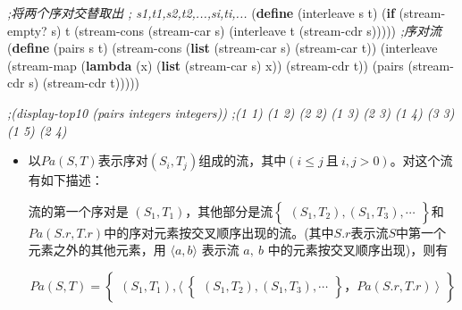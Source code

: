 \documentclass[]{article}
\date{}
\newenvironment{Shaded}{}{}
\newcommand{\KeywordTok}[1]{\textcolor[rgb]{0.00,0.44,0.13}{\textbf{#1}}}
\newcommand{\CommentTok}[1]{\textcolor[rgb]{0.38,0.63,0.69}{\textit{#1}}}
\newcommand{\FunctionTok}[1]{\textcolor[rgb]{0.02,0.16,0.49}{#1}}
\newcommand{\NormalTok}[1]{#1}
\begin{document}
\begin{Shaded}
\begin{Highlighting}[]
\CommentTok{;将两个序对交替取出}
\CommentTok{; s1,t1,s2,t2,...,si,ti,...}
\NormalTok{(}\KeywordTok{define}\FunctionTok{ }\NormalTok{(interleave s t)}
\NormalTok{    (}\KeywordTok{if}\NormalTok{ (stream-empty? s)}
\NormalTok{        t}
\NormalTok{        (stream-cons (stream-car s)}
\NormalTok{                     (interleave t (stream-cdr s)))))}
\CommentTok{;序对流}
\NormalTok{(}\KeywordTok{define}\FunctionTok{ }\NormalTok{(pairs s t)}
\NormalTok{    (stream-cons}
\NormalTok{        (}\KeywordTok{list}\NormalTok{ (stream-car s) (stream-car t))}
\NormalTok{        (interleave}
\NormalTok{            (stream-map (}\KeywordTok{lambda}\NormalTok{ (x) (}\KeywordTok{list}\NormalTok{ (stream-car s) x))}
\NormalTok{                        (stream-cdr t))}
\NormalTok{            (pairs (stream-cdr s) (stream-cdr t)))))}

\CommentTok{;(display-top10 (pairs integers integers))}
\CommentTok{;(1 1)  (1 2)  (2 2)  (1 3)  (2 3)  (1 4)  (3 3)  (1 5)  (2 4) }
\end{Highlighting}
\end{Shaded}

\begin{itemize}
\item
  以\(Pa(S, T)\)表示序对\((S_i, T_j)\)组成的流，其中\((i \le j\  且\ i, j > 0)\)。对这个流有如下描述：

  流的第一个序对是
  \((S_1, T_1)\)，其他部分是流\( \begin{Bmatrix}(S_1, T_2), (S_1, T_3), \cdots\end{Bmatrix} \)和
  \(Pa(S.r, T.r) \)中的序对元素按交叉顺序出现的流。(其中\(S.r\)表示流\(S\)中第一个元素之外的其他元素，用
  \(\langle a, b \rangle\) 表示流 \(a,\ b\)
  中的元素按交叉顺序出现)，则有

  \[Pa(S, T) = \begin{Bmatrix}(S_1, T_1), \langle\ \begin{Bmatrix}(S_1, T_2), (S_1, T_3), \cdots\end{Bmatrix}，Pa(S.r, T.r)\  \rangle \end{Bmatrix}\]
\end{itemize}
\end{document}
